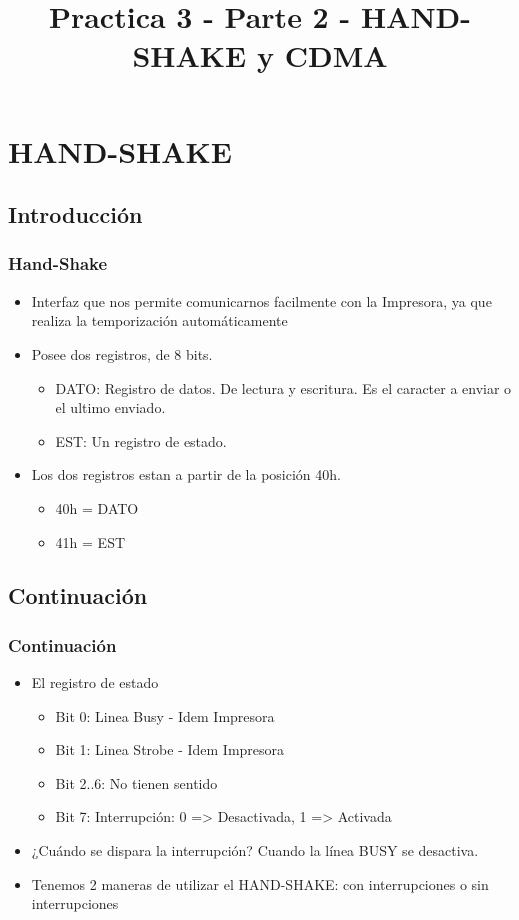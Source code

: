 \documentclass{beamer}
\title{Practica 3 - Parte 2 - HAND-SHAKE y CDMA}
\begin{document}
\begin{frame}
\titlepage
\end{frame}

\section{HAND-SHAKE}
\subsection{Introducción}
\begin{frame}
\frametitle{Hand-Shake}
\begin{itemize}
 \item Interfaz que nos permite comunicarnos facilmente con la Impresora, ya que realiza la temporización automáticamente
 \item Posee dos registros, de 8 bits.
  \begin{itemize}
   \item DATO: Registro de datos. De lectura y escritura. Es el caracter a enviar o el ultimo enviado.
   \item EST: Un registro de estado.
  \end{itemize}
 \item Los dos registros estan a partir de la posición 40h. 
  \begin{itemize}
      \item 40h = DATO
      \item 41h = EST
\end{itemize}
\end{itemize}
\end{frame}

\subsection{Continuación}
\begin{frame}
\frametitle{Continuación}
\begin{itemize}
 \item El registro de estado 
 \begin{itemize}
   \item Bit 0: Linea Busy - Idem Impresora
   \item Bit 1: Linea Strobe - Idem Impresora
   \item Bit 2..6: No tienen sentido
   \item Bit 7: Interrupción: 0 => Desactivada, 1 => Activada
  \end{itemize}
 \item ¿Cuándo se dispara la interrupción? Cuando la línea BUSY se desactiva.
 \item Tenemos 2 maneras de utilizar el HAND-SHAKE: con interrupciones o sin interrupciones
\end{itemize}
\end{frame}
\end{document}
